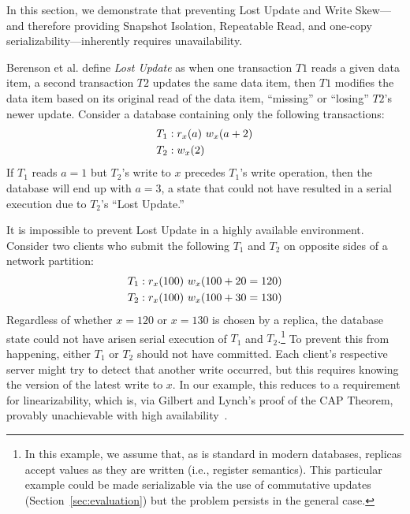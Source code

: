 In this section, we demonstrate that preventing Lost Update and Write
Skew---and therefore providing Snapshot Isolation, Repeatable Read,
and one-copy serializability---inherently requires unavailability.

Berenson et al. define \textit{Lost Update} as when one
transaction $T1$ reads a given data item, a second transaction $T2$
updates the same data item, then $T1$ modifies the data item based on
its original read of the data item, ``missing'' or ``losing'' $T2$'s
newer update. Consider a database containing only the following
transactions:
\begin{align*}
\small\vspace{-1em}
T_1 &: r_x(a)~w_x(a+2)
\\T_2 &: w_x(2)\vspace{-1em}
\end{align*}
If $T_1$ reads $a=1$ but $T_2$'s write to $x$ precedes $T_1$'s write
operation, then the database will end up with $a=3$, a state that
could not have resulted in a serial execution due to $T_2$'s
``Lost Update.''

It is impossible to prevent Lost Update in a highly available
environment. Consider two clients who submit the following $T_1$ and
$T_2$ on opposite sides of a network partition:
\begin{align*}
\small\vspace{-1em}
T_1 &: r_x(100)~w_x(100+20=120)
\\T_2 &: r_x(100)~w_x(100+30=130)\vspace{-1em}
\end{align*}
Regardless of whether $x=120$ or $x=130$ is chosen by a replica, the
database state could not have arisen serial execution of $T_1$ and
$T_2$.\footnote{In this example, we assume that, as is standard in
  modern databases, replicas accept values as they are written (i.e.,
  register semantics). This particular example could be made
  serializable via the use of commutative updates
  (Section~\ref{sec:evaluation}) but the problem persists in the
  general case.}  To prevent this from happening, either $T_1$ or
$T_2$ should not have committed. Each client's respective server might
try to detect that another write occurred, but this requires knowing
the version of the latest write to $x$. In our example, this reduces
to a requirement for linearizability, which is, via Gilbert and
Lynch's proof of the CAP Theorem, provably unachievable with high
availability~\cite{gilbert-cap}.

